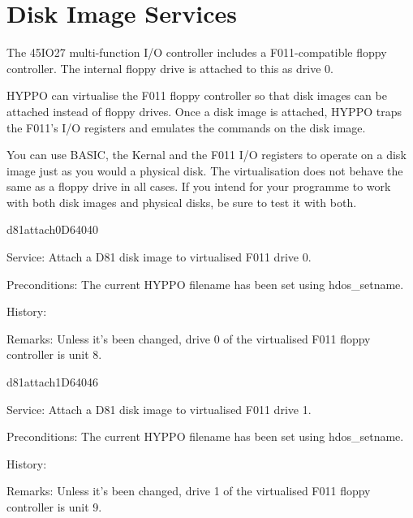 \newpage
\section{Disk Image Services}

The 45IO27 multi-function I/O controller includes a F011-compatible floppy
controller. The internal floppy drive is attached to this as drive 0.

HYPPO can virtualise the F011 floppy controller so that disk images
can be attached instead of floppy drives. Once a disk image is attached,
HYPPO traps the F011's I/O registers and emulates the commands on the disk
image.

You can use BASIC, the Kernal and the F011 I/O registers to operate on a disk
image just as you would a physical disk. The virtualisation does not behave the
same as a floppy drive in all cases. If you intend for your programme to work
with both disk images and physical disks, be sure to test it with both.


\begin{hyppotrap}{d81attach0}{D640}{40}
\item [Service:]
  Attach a D81 disk image to virtualised F011 drive 0.
\item [Preconditions:]
  The current HYPPO filename has been set using hdos\_setname.
\item [History:]
\item [Remarks:]
  Unless it's been changed, drive 0 of the virtualised F011 floppy controller is
  unit 8.
\end{hyppotrap}


\newpage
\begin{hyppotrap}{d81attach1}{D640}{46}
\item [Service:]
  Attach a D81 disk image to virtualised F011 drive 1.
\item [Preconditions:]
  The current HYPPO filename has been set using hdos\_setname.
\item [History:]
\item [Remarks:]
  Unless it's been changed, drive 1 of the virtualised F011 floppy controller is
  unit 9.
\end{hyppotrap}


